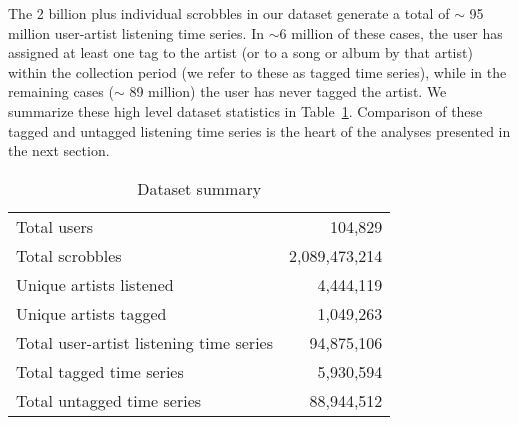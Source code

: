 The 2 billion plus individual scrobbles in our dataset generate a total of $\sim$ 95 million user-artist listening time series. In $\sim 6$ million of these cases, the user has assigned at least one tag to the artist (or to a song or album by that artist) within the collection period (we refer to these as tagged time series), while in the remaining cases ($\sim$ 89 million) the user has never tagged the artist. We summarize these high level dataset statistics in Table~\ref{tab:data_summary}. Comparison of these tagged and untagged listening time series is the heart of the analyses presented in the next section.

\begin{table}[h]
\begin{center}
\begin{tabular}{l|r}
\toprule
Total users & 104,829 \\
Total scrobbles & 2,089,473,214 \\
Unique artists listened & 4,444,119 \\
Unique artists tagged & 1,049,263 \\
\midrule
Total user-artist listening time series & 94,875,106 \\
Total tagged time series & 5,930,594 \\
Total untagged time series & 88,944,512 \\
\bottomrule
\end{tabular}
\end{center}
\caption{Dataset summary}
\label{tab:data_summary}
\end{table}

